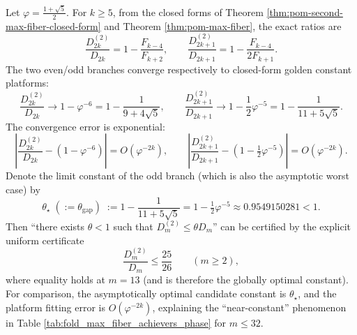 \begin{corollary}\label{cor:pom-second-max-gap-constant}
Let \(\varphi=\frac{1+\sqrt5}{2}\). For \(k\ge 5\), from the closed forms of Theorem \ref{thm:pom-second-max-fiber-closed-form} and Theorem \ref{thm:pom-max-fiber}, the exact ratios are
\[
\frac{D_{2k}^{(2)}}{D_{2k}}=1-\frac{F_{k-4}}{F_{k+2}},
\qquad
\frac{D_{2k+1}^{(2)}}{D_{2k+1}}=1-\frac{F_{k-4}}{2F_{k+1}}.
\]
The two even/odd branches converge respectively to closed-form golden constant platforms:
\[
\frac{D_{2k}^{(2)}}{D_{2k}}
\longrightarrow
1-\varphi^{-6}
=1-\frac{1}{9+4\sqrt5},
\qquad
\frac{D_{2k+1}^{(2)}}{D_{2k+1}}
\longrightarrow
1-\frac12\varphi^{-5}
=1-\frac{1}{11+5\sqrt5}.
\]
The convergence error is exponential:
\[
\left|\frac{D_{2k}^{(2)}}{D_{2k}}-\left(1-\varphi^{-6}\right)\right|=O(\varphi^{-2k}),
\qquad
\left|\frac{D_{2k+1}^{(2)}}{D_{2k+1}}-\left(1-\tfrac12\varphi^{-5}\right)\right|=O(\varphi^{-2k}).
\]
Denote the limit constant of the odd branch (which is also the asymptotic worst case) by
\[
\boxed{\;
\theta_\star\;(:=\theta_{\mathrm{gap}})\;:=1-\frac{1}{11+5\sqrt5}
=1-\tfrac12\varphi^{-5}
\approx 0.9549150281<1.
\;}
\]
Then ``there exists \(\theta<1\) such that \(D_m^{(2)}\le \theta D_m\)'' can be certified by the explicit uniform certificate
\[
\boxed{\;
\frac{D_m^{(2)}}{D_m}\le \frac{25}{26}\qquad(m\ge 2),
\;}
\]
where equality holds at \(m=13\) (and is therefore the globally optimal constant). For comparison, the asymptotically optimal candidate constant is \(\theta_\star\), and the platform fitting error is \(O(\varphi^{-2k})\), explaining the ``near-constant'' phenomenon in Table \ref{tab:fold_max_fiber_achievers_phase} for \(m\le 32\).
\end{corollary}
